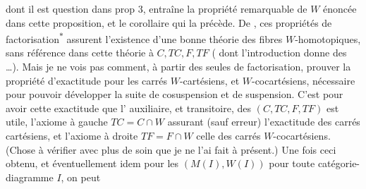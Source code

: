 
dont il est question dans prop 3,  entraîne
la propriété remarquable de $W$ énoncée
dans cette proposition, et  le corollaire
qui la précède.  De \unsure{$=$}, ces propriétés
de factorisation\textsuperscript{$*$} assurent l'existence d'une
bonne théorie des fibres  $W$-homotopiques,
sans  référence dans cette théorie à $C,TC,F,TF$
( dont l'introduction donne  des  \ldots). Mais je ne vois pas comment,
à partir des seules  de factorisation,
prouver la propriété  d'exactitude
pour les carrés $W$-cartésiens, et
$W$-cocartésiens, nécessaire pour pouvoir
développer la suite  de cosuspension
et de suspension. C'est pour avoir cette
exactitude que l' auxiliaire,
et transitoire, des  $(C,TC,F,TF)$
est utile, l'axiome  à gauche $TC=C\cap W$
assurant (sauf erreur) l'exactitude des
carrés cartésiens, et l'axiome à droite
$TF=F\cap W$ celle des carrés $W$-cocartésiens.
(Chose à vérifier avec plus de soin que je
ne l'ai fait à présent.) Une fois ceci obtenu,
et éventuellement idem pour les $(M(I),W(I))$
pour toute catégorie-diagramme $I$, on peut
